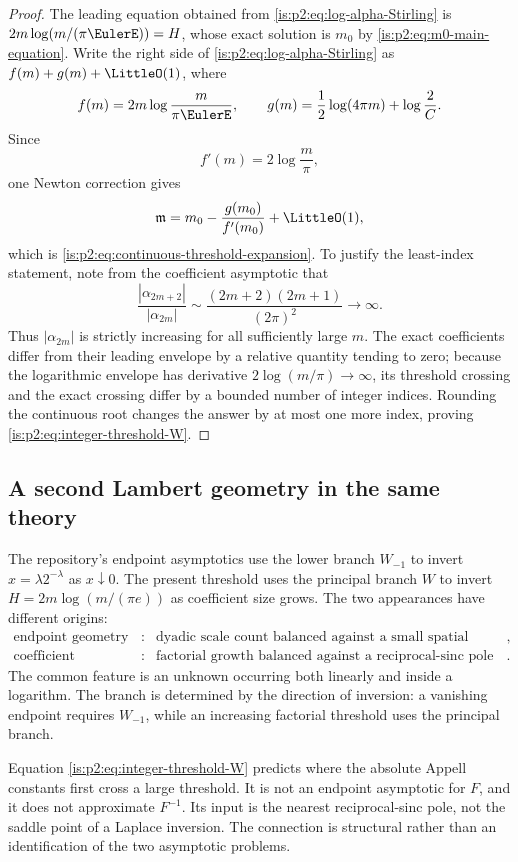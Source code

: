 \begin{proof}
The leading equation obtained from \eqref{is:p2:eq:log-alpha-Stirling} is
$2m\log(m/(\pi\EulerE))=H$, whose exact solution is $m_0$ by
\eqref{is:p2:eq:m0-main-equation}.  Write the right side of \eqref{is:p2:eq:log-alpha-Stirling} as
$f(m)+g(m)+\LittleO(1)$, where
\[
 f(m)=2m\log\frac{m}{\pi\EulerE},
 \qquad
 g(m)=\frac12\log(4\pi m)+\log\frac2C.
\]
Since
\begin{equation*}
 f'(m)=2\log\frac m\pi,
\end{equation*}
one Newton correction gives
\[
 \mathfrak m=m_0-\frac{g(m_0)}{f'(m_0)}+\LittleO(1),
\]
which is \eqref{is:p2:eq:continuous-threshold-expansion}.  To justify the
least-index statement, note from the coefficient asymptotic that
\[
 \frac{|\alpha_{2m+2}|}{|\alpha_{2m}|}
 \sim\frac{(2m+2)(2m+1)}{(2\pi)^2}\longrightarrow\infty.
\]
Thus $|\alpha_{2m}|$ is strictly increasing for all sufficiently large $m$.
The exact coefficients differ from their leading envelope by a relative
quantity tending to zero; because the logarithmic envelope has derivative
$2\log(m/\pi)\to\infty$, its threshold crossing and the exact crossing differ
by a bounded number of integer indices.  Rounding the continuous root changes
the answer by at most one more index, proving
\eqref{is:p2:eq:integer-threshold-W}.
\end{proof}

\subsection{A second Lambert geometry in the same theory}

The repository's endpoint asymptotics use the lower branch $W_{-1}$ to invert
$x=\lambda2^{-\lambda}$ as $x\downarrow0$.  The present threshold uses the principal branch $W$
to invert $H=2m\log(m/(\pi e))$ as coefficient size grows.  The two appearances have different
origins:
\begin{equation}
 \begin{array}{ccl}
 \text{endpoint geometry} &:&
 \text{dyadic scale count balanced against a small spatial argument},\\[0.25em]
 \text{coefficient geometry} &:&
 \text{factorial growth balanced against a reciprocal-sinc pole radius}.
 \end{array}
 \label{is:p2:eq:two-Lambert-roles}
\end{equation}
The common feature is an unknown occurring both linearly and inside a logarithm.  The branch is
determined by the direction of inversion: a vanishing endpoint requires $W_{-1}$, while an increasing
factorial threshold uses the principal branch.

\begin{cautionbox}
Equation \eqref{is:p2:eq:integer-threshold-W} predicts where the absolute Appell constants first cross a
large threshold.  It is not an endpoint asymptotic for $F$, and it does not approximate $F^{-1}$.
Its input is the nearest reciprocal-sinc pole, not the saddle point of a Laplace inversion.  The
connection is structural rather than an identification of the two asymptotic problems.
\end{cautionbox}
